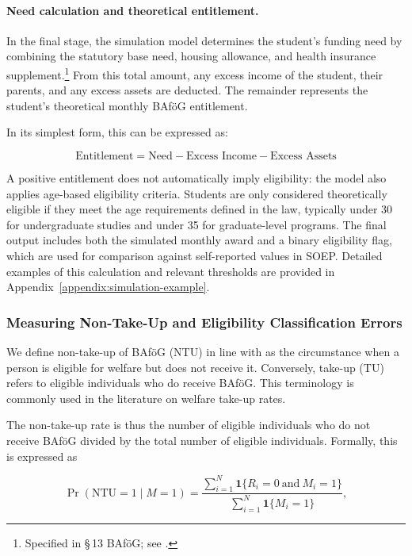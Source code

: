 \paragraph{Need calculation and theoretical entitlement.}
In the final stage, the simulation model determines the student's funding need by combining the statutory base need, housing allowance, and health insurance supplement.\footnote{Specified in §\,13 BAföG; see \citet{bafoeg_law}.} 
From this total amount, any excess income of the student, their parents, and any excess assets are deducted. The remainder represents the student's theoretical monthly BAföG entitlement.

In its simplest form, this can be expressed as:

\begin{equation}
    \text{Entitlement} = \text{Need} - \text{Excess Income} - \text{Excess Assets}
\end{equation}

A positive entitlement does not automatically imply eligibility: the model also applies age-based eligibility criteria. 
Students are only considered theoretically eligible if they meet the age requirements defined in the law, typically under 30 for undergraduate studies and under 35 for graduate-level programs. 
The final output includes both the simulated monthly award and a binary eligibility flag, which are used for comparison against self-reported values in SOEP. 
Detailed examples of this calculation and relevant thresholds are provided in Appendix~\ref{appendix:simulation-example}.

\subsubsection{Measuring Non-Take-Up and Eligibility Classification Errors}

We define non-take-up of BAföG (NTU) in line with \cite{nelson_towards_2021} as the circumstance when a person is eligible for welfare but does not receive it. Conversely, take-up (TU) refers to eligible individuals who do receive BAföG. This terminology is commonly used in the literature on welfare take-up rates. 

The non-take-up rate is thus the number of eligible individuals who do not receive BAföG divided by the total number of eligible individuals. Formally, this is expressed as

\begin{equation}
\Pr(\text{NTU} = 1 \mid M = 1) = \frac{\sum_{i=1}^{N} \mathbf{1}\{R_i = 0 \ \text{and} \ M_i = 1\}}{\sum_{i=1}^{N} \mathbf{1}\{M_i = 1\}},
\end{equation}

